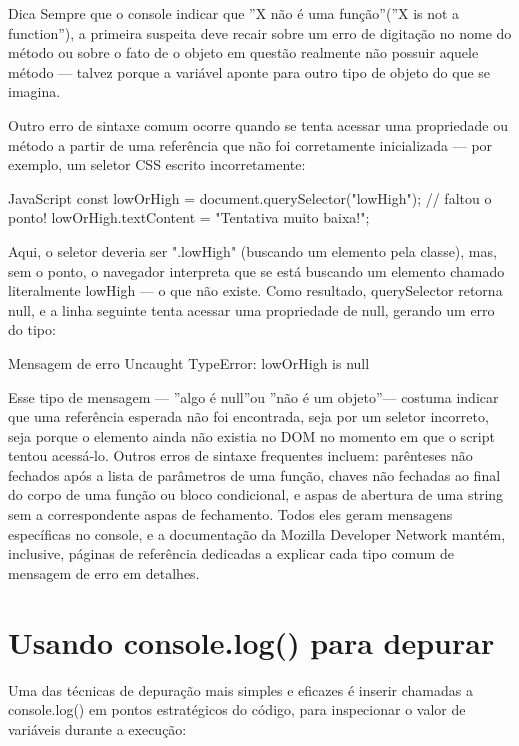 \begin{infobox}{Dica}
Sempre que o console indicar que ”X não é uma função”(”X is not a function”), a primeira suspeita deve recair sobre um erro de digitação no nome do método ou sobre o fato de o objeto em questão realmente não possuir aquele método — talvez porque a variável aponte para outro tipo de objeto do que se imagina.
\end{infobox}

Outro erro de sintaxe comum ocorre quando se tenta acessar uma propriedade ou método a partir de uma referência que não foi corretamente inicializada — por exemplo, um seletor CSS escrito incorretamente:

\begin{codebox}{JavaScript}
 const lowOrHigh = document.querySelector("lowHigh"); // faltou o ponto!
 lowOrHigh.textContent = "Tentativa muito baixa!";
\end{codebox}

Aqui, o seletor deveria ser ".lowHigh" (buscando um elemento pela classe), mas, sem o ponto, o navegador interpreta que se está buscando um elemento chamado literalmente lowHigh — o que não existe. Como resultado, querySelector retorna null, e a linha seguinte tenta acessar uma propriedade de null, gerando um erro do tipo:

\begin{infobox}{Mensagem de erro}
Uncaught TypeError: lowOrHigh is null
\end{infobox}

Esse tipo de mensagem — ”algo é null”ou ”não é um objeto”— costuma indicar que uma referência esperada não foi encontrada, seja por um seletor incorreto, seja porque o elemento ainda não existia no DOM no momento em que o script tentou acessá-lo. Outros erros de sintaxe frequentes incluem: parênteses não fechados após a lista de parâmetros de uma função, chaves não fechadas ao final do corpo de uma função ou bloco condicional, e aspas de abertura de uma string sem a correspondente aspas de fechamento. Todos eles geram mensagens específicas no console, e a documentação da Mozilla Developer Network mantém, inclusive, páginas de referência dedicadas a explicar cada tipo comum de mensagem de erro em detalhes.

\section{Usando console.log() para depurar}

Uma das técnicas de depuração mais simples e eficazes é inserir chamadas a console.log() em pontos estratégicos do código, para inspecionar o valor de variáveis durante a execução:


